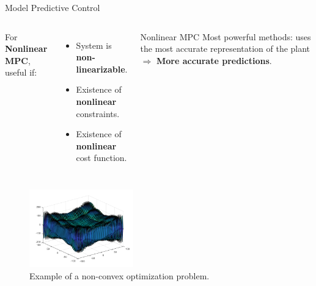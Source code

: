 \documentclass{thesisbeamer}
\begin{document}
\begin{frame}[t]{Model Predictive Control} \vspace{4pt}

\begin{columns}


For \textbf{Nonlinear MPC}, useful if:
\begin{itemize}
	\item System is \textbf{non-linearizable}.
	\item Existence of \textbf{nonlinear} constraints.
	\item Existence of \textbf{nonlinear} cost function.
\end{itemize}


\begin{block}{Nonlinear MPC}
\vspace{0.5em}
Most powerful methods: uses the most accurate representation of the plant $\Rightarrow$ \textbf{More accurate predictions}.
\vspace{0.5em}
\end{block}
\end{columns}

\begin{figure}
	\centering	\includegraphics[width=0.4\textwidth]{Images/Control/MPC_Nonconvex_Equation_b}
	\caption{Example of a non-convex optimization problem.}
\end{figure}
\end{frame}



\end{document}
